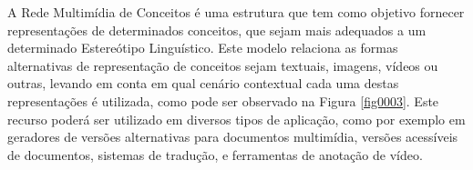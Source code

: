 \documentclass{sig-alternate}
\begin{document}
\begin{table}[!htb]
\centering
\caption{Exemplo de resumo de um Estereótipo Linguístico.}
\label{table0002}
\end{table}



A Rede Multimídia de Conceitos é uma estrutura que tem como objetivo fornecer representações de determinados conceitos, que sejam mais adequados a um determinado Estereótipo Linguístico. Este modelo relaciona as formas alternativas de representação de conceitos sejam textuais, imagens, vídeos ou outras, levando em conta em qual cenário contextual cada uma destas representações é utilizada, como pode ser observado na Figura \ref{fig0003}. Este recurso poderá ser utilizado em diversos tipos de aplicação, como por exemplo em geradores de versões alternativas para documentos multimídia, versões acessíveis de documentos, sistemas de tradução, e ferramentas de anotação de vídeo. 
\end{document}
